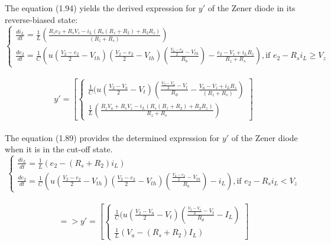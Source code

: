 The equation (1.94) yields the derived expression for $y'$ of the Zener diode in its reverse-biased state:\\

\begin{equation}
    \begin{cases}
        \frac{di_L}{dt}=\frac{1}{L}(\frac{R_ze_2+R_sV_z-i_L(R_s(R_z+R_2)+R_2R_z)}{(R_z+R_s)})\\
        \frac{de_2}{dt}=\frac{1}{C}(u(\frac{V_2-e_2}{2}-V_{th})(\frac{V_2-e_2}{2}-V_{th})(\frac{\frac{V_2-e_2}{2}-V_{th}}{R_b})-\frac{e_2-V_z+i_LR_z}{R_z+R_s}),  \text{if } e_2-R_si_L \geq V_z
    \end{cases}
\end{equation}\\

\begin{equation}
    y'=[\begin{cases}
        \frac{1}{C}(u(\frac{V_2-V_a}{2}-V_t)(\frac{\frac{V_2-V_a}{2}-V_t}{R_d}-\frac{V_a-V_z+i_LR_z}{(R_z+R_s)})\\
        \frac{1}{L}(\frac{R_zV_a+R_sV_z-i_L(R_s(R_z+R_2)+R_2R_z)}{R_z+R_s})
    \end{cases}]
\end{equation}\\

The equation (1.89) provides the determined expression for $y'$ of the Zener diode when it is in the cut-off state.\\

\begin{equation}
    \begin{cases}
        \frac{di_L}{dt}=\frac{1}{L}(e_2-(R_s+R_2)i_L)\\
        \frac{de_2}{dt}=\frac{1}{C}\left(u\left(\frac{V_2-e_2}{2}-V_{th}\right)\left(\frac{V_2-e_2}{2}-V_{th}\right)\left(\frac{\frac{V_2-e_2}{2}-V_{th}}{R_b}\right)-i_L\right), \text{if } e_2-R_si_L<V_z
    \end{cases}
\end{equation}\\

\begin{equation}
    =>y'=[\begin{cases}
        \frac{1}{C}(u(\frac{V_2-V_a}{2}-V_t)(\frac{\frac{V_2-V_a}{2}-V_t}{R_d}-I_L)\\
        \frac{1}{L}(V_a-(R_s+R_2)I_L)
    \end{cases}]
\end{equation}\\

